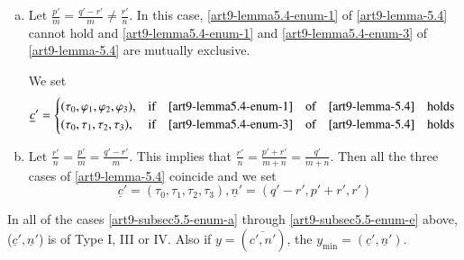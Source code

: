 \begin{enumerate}[(a)]
\item Let $\frac{p'}{m} = \frac{q'-r'}{m} \neq \frac{r'}{n}$. In this case, \eqref{art9-lemma5.4-enum-1}
of \ref{art9-lemma-5.4} cannot hold and \eqref{art9-lemma5.4-enum-1} and \eqref{art9-lemma5.4-enum-3} of \ref{art9-lemma-5.4} are mutually exclusive.\label{art9-subsec5.5-enum-d}

We set
\begin{align*}
\underline{c}'&=
\begin{cases}
(\tau_{0}, \varphi_{1}, \varphi_{2},\varphi_{3}), &\text{if}\quad \eqref{art9-lemma5.4-enum-1}\quad \text{of}\quad \ref{art9-lemma-5.4}\quad \text{holds}\\
(\tau_{0}, \tau_{1}, \tau_{2}, \tau_{3}), &\text{if}\quad \eqref{art9-lemma5.4-enum-3}\quad \text{of}\quad \ref{art9-lemma-5.4}\quad \text{holds}\\ 
\end{cases}
\end{align*}

\item Let $\frac{r'}{n} = \frac{p'}{m} = \frac{q'-r'}{m}$. This implies that $\frac{r'}{n} = \frac{p'+r'}{m+n} = \frac{q'}{m+n}$. Then all the three cases of \ref{art9-lemma-5.4} coincide and we set\label{art9-subsec5.5-enum-e}
$$
\underline{c}' = (\tau_{0}, \tau_{1}, \tau_{2}, \tau_{3}), \underline{n}' = (q'-r', p'+r',r')
$$
\end{enumerate}

\setcounter{equation}{5}
\begin{remark}\label{art9-remark-5.6}
In all of the cases \eqref{art9-subsec5.5-enum-a} through \eqref{art9-subsec5.5-enum-e} above, ($\underline{c}', \underline{n}'$) is of Type I, III or IV. Also if $y = (\overline{c',n'})$, the $y_{\min} = (\underline{c}', \underline{n}')$.
\end{remark}

